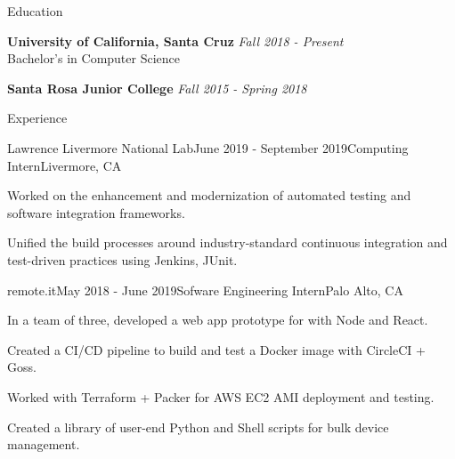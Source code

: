 \documentclass{resume} %
\begin{document}

\begin{rSection}{Education}

    {\bf University of California, Santa Cruz} \hfill {\em Fall 2018 - Present} \\ 
    Bachelor's in Computer Science

    {\bf Santa Rosa Junior College} \hfill {\em Fall 2015 - Spring 2018}

\end{rSection}


\begin{rSection}{Experience}

    \begin{rSubsection}{Lawrence Livermore National Lab}{June 2019 - September 2019}{Computing Intern}{Livermore, CA}
        \item Worked on the enhancement and modernization of automated testing and software integration frameworks.
        \item Unified the build processes around industry-standard continuous integration and test-driven practices using Jenkins, JUnit.
    \end{rSubsection}

    \begin{rSubsection}{remote.it}{May 2018 - June 2019}{Sofware Engineering Intern}{Palo Alto, CA}
        \item In a team of three, developed a web app prototype for with Node and React.
        \item Created a CI/CD pipeline to build and test a Docker image with CircleCI + Goss.
        \item Worked with Terraform + Packer for AWS EC2 AMI deployment and testing.
        \item Created a library of user-end Python and Shell scripts for bulk device management.
    \end{rSubsection}

\end{rSection}

\end{document}
